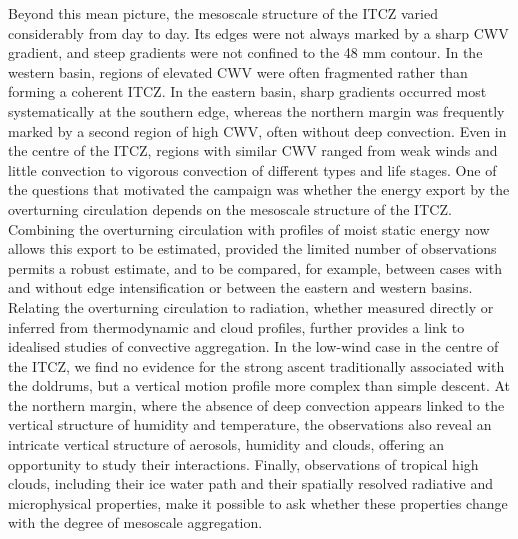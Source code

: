 \documentclass[acp, manuscript]{copernicus}
\begin{document}
Beyond this mean picture, the mesoscale structure of the ITCZ varied considerably from day to day. Its edges were not always marked by a sharp CWV gradient, and steep gradients were not confined to the 48 mm contour. In the western basin, regions of elevated CWV were often fragmented rather than forming a coherent ITCZ. In the eastern basin, sharp gradients occurred most systematically at the southern edge, whereas the northern margin was frequently marked by a second region of high CWV, often without deep convection. Even in the centre of the ITCZ, regions with similar CWV ranged from weak winds and little convection to vigorous convection of different types and life stages.
One of the questions that motivated the campaign was whether the energy export by the overturning circulation depends on the mesoscale structure of the ITCZ. Combining the overturning circulation with profiles of moist static energy now allows this export to be estimated, provided the limited number of observations permits a robust estimate, and to be compared, for example, between cases with and without edge intensification or between the eastern and western basins. Relating the overturning circulation to radiation, whether measured directly or inferred from thermodynamic and cloud profiles, further provides a link to idealised studies of convective aggregation. In the low-wind case in the centre of the ITCZ, we find no evidence for the strong ascent traditionally associated with the doldrums, but a vertical motion profile more complex than simple descent. At the northern margin, where the absence of deep convection appears linked to the vertical structure of humidity and temperature, the observations also reveal an intricate vertical structure of aerosols, humidity and clouds, offering an opportunity to study their interactions. Finally, observations of tropical high clouds, including their ice water path and their spatially resolved radiative and microphysical properties, make it possible to ask whether these properties change with the degree of mesoscale aggregation.%

\end{document}
